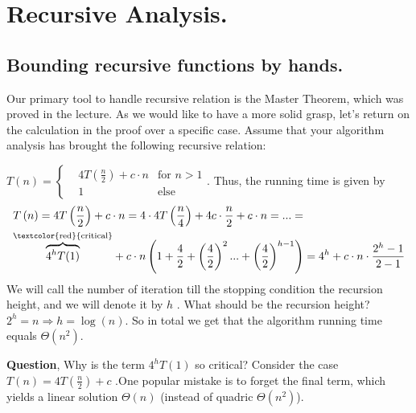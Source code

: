 \setcounter{chapter}{2}
\section{Recursive Analysis.} 
% 
%

\subsection{Bounding recursive functions by hands.} Our primary tool to handle recursive relation is the Master Theorem, which was proved in the lecture. As we would like to have a more solid grasp, let's return on the calculation in the proof over a specific case. 
Assume that your algorithm analysis has brought the following recursive relation:
    \begin{example}\( T\left(n\right)  = \left\{ \begin{array}{rcl}
& 4T\left(\frac{n}{2}\right)+c\cdot n & \mbox{for }  n > 1  \\
& 1 & \mbox{else}  
\end{array}\right. \). Thus, the running time is given by \begin{equation*}
    \begin{split}
 & T\left(n\right)  = 4T\left(\frac{n}{2}\right)+c\cdot n=  4\cdot4T\left(\frac{n}{4}\right)+4c\cdot\frac{n}{2}+c\cdot n = ... = \\ & \overset{\text{\textcolor{red}{critical}}}{\overbrace{4^{h}T(1)}} + c\cdot n\left(1+\frac{4}{2}+\left(\frac{4}{2}\right)^{2}...+\left(\frac{4}{2}\right)^{h-1}\right) = 4^{h} + c\cdot n\cdot\frac{2^{h}-1}{2-1}
    \end{split}
\end{equation*}
We will call the number of iteration till the stopping condition the recursion height, and we will denote it by \(h\) . What should be the recursion height? \( 2^{h} = n \Rightarrow h =\log\left(n\right) \). So in total we get that the algorithm running time equals \( \Theta\left(n^2\right)\). 
\end{example}
\textbf{Question}, Why is the term \( 4^{h} T(1) \) so critical? Consider the case \(T\left(n\right) =  4T\left(\frac{n}{2}\right) + c \) .One popular mistake is to forget the final term, which yields a linear solution \( \Theta(n)\) (instead of quadric \( \Theta(n^2)\)).   

